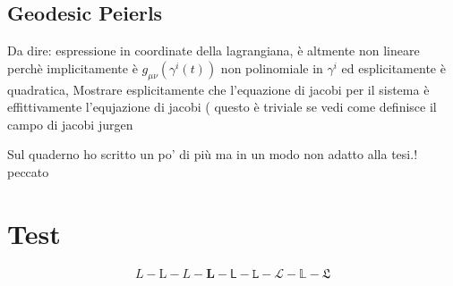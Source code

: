 \documentclass[Main]{subfiles}
\begin{document}
\section{Geodesic Peierls}
	\begin{Warning}
		Da dire: espressione in coordinate della lagrangiana, è altmente non lineare perchè implicitamente è $g_{\mu\nu}(\gamma^i(t))$ non polinomiale in $\gamma^i$ ed esplicitamente è quadratica, Mostrare esplicitamente che l'equazione di jacobi per il sistema è effittivamente l'equjazione di jacobi ( questo è triviale se vedi come definisce il campo di jacobi jurgen 
	\end{Warning}	
	\begin{Warning}
		Sul quaderno ho scritto un po' di più ma in un modo non adatto alla tesi.! peccato
	\end{Warning}	
	



\chapter{Test}
	$$L - \mathrm{L} - \mathit{L}  - \mathbf{L} - \mathsf{L} - \mathtt{L}- \mathcal{L}- \mathbb{L}- \mathfrak{L}$$
\end{document}
